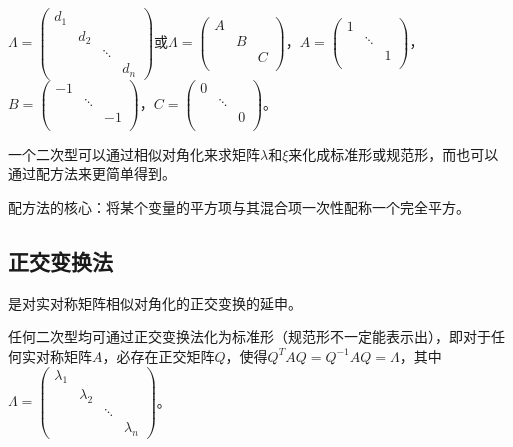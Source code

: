 \documentclass[UTF8, 12pt]{ctexart}
\begin{document}
$\Lambda=\left(\begin{array}{cccc}
    d_1 \\
     & d_2 \\
     & & \ddots \\
     & & & d_n
\end{array}\right)$或$\Lambda=\left(\begin{array}{ccccccccc}
    A \\
     & B \\
     & & C \\
\end{array}\right)$，$A=\left(\begin{array}{ccc}
    1 \\
     & \ddots \\
     & & 1 \\
\end{array}\right)$，$B=\left(\begin{array}{ccc}
    -1 \\
     & \ddots \\
     & & -1 \\
\end{array}\right)$，$C=\left(\begin{array}{ccc}
    0 \\
     & \ddots \\
     & & 0 \\
\end{array}\right)$。\medskip

一个二次型可以通过相似对角化来求矩阵$\lambda$和$\xi$来化成标准形或规范形，而也可以通过配方法来更简单得到。

配方法的核心：将某个变量的平方项与其混合项一次性配称一个完全平方。

\subsection{正交变换法}

是对实对称矩阵相似对角化的正交变换的延申。

任何二次型均可通过正交变换法化为标准形（规范形不一定能表示出），即对于任何实对称矩阵$A$，必存在正交矩阵$Q$，使得$Q^TAQ=Q^{-1}AQ=\Lambda$，其中$\Lambda=\left(\begin{array}{cccc}
    \lambda_1 \\
     & \lambda_2 \\
     & & \ddots \\
     & & & \lambda_n
\end{array}\right)$。
\end{document}
